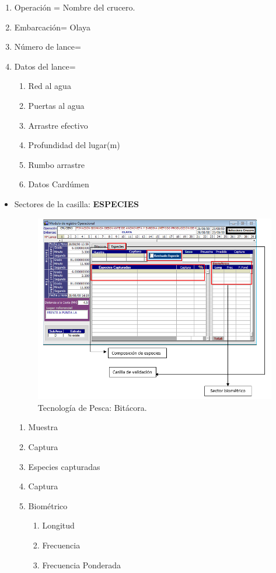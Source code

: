 \documentclass[a4paper,oneside,11pt]{book}
\begin{document}
 \begin{enumerate}
 \item Operación = Nombre del crucero.
 \item Embarcación= Olaya 
 \item Número de lance=
 \item Datos del lance= 
 \begin{enumerate}
\item Red al agua 
\item Puertas al agua 
\item Arrastre efectivo
\item Profundidad del lugar(m)
\item Rumbo arrastre
\item Datos Cardúmen 
\end{enumerate}
\end{enumerate}
\newpage
\begin{itemize}
\item Sectores de la casilla: \textbf{ESPECIES}

        
 \begin{figure} [!h]
 \begin{center}
 \includegraphics[scale=0.52]{imagen_manual_OPEMAR/casilla5.png}
    \caption{Tecnología de Pesca: Bitácora.}
  \end{center}
\end{figure}





\begin{enumerate}
\item Muestra
\item Captura
\item Especies capturadas
\item Captura
\item Biométrico 
\begin{enumerate}
\item Longitud
\item Frecuencia
\item Frecuencia Ponderada
\end{enumerate}
\end{enumerate}
 \end{itemize} 
\end{document}
